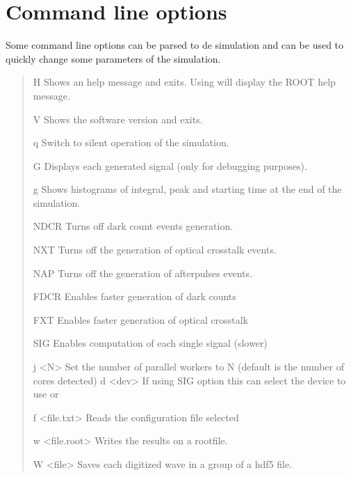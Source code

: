 \documentclass[letterpaper,10pt,english]{sphinxmanual}
\begin{document}
\section{Command line options}
\label{\detokenize{setup:command-line-options}}\label{\detokenize{setup:clineopts}}
Some command line options can be parsed to de simulation and can be used to quickly change some parameters of the simulation.
\begin{quote}
\begin{optionlist}{3cm}
\item [\sphinxhyphen{}H]  
Shows an help message and exits. Using  will display the ROOT help message.
\item [\sphinxhyphen{}V]  
Shows the software version and exits.
\item [\sphinxhyphen{}q]  
Switch to silent operation of the simulation.
\item [\sphinxhyphen{}G]  
Displays each generated signal (only for debugging purposes).
\item [\sphinxhyphen{}g]  
Shows histograms of integral, peak and starting time at the end of the simulation.
\item [\sphinxhyphen{}NDCR]  
Turns off dark count events generation.
\item [\sphinxhyphen{}NXT]  
Turns off the generation of optical crosstalk events.
\item [\sphinxhyphen{}NAP]  
Turns off the generation of afterpulses events.
\item [\sphinxhyphen{}FDCR]  
Enables faster generation of dark counts {\hyperref[\detokenize{theory:dcrtheory}]{}}
\item [\sphinxhyphen{}FXT]  
Enables faster generation of optical crosstalk {\hyperref[\detokenize{theory:xttheory}]{}}
\item [\sphinxhyphen{}SIG]  
Enables computation of each single signal (slower)
\item [\sphinxhyphen{}j \textless{}N\textgreater{}]  
Set the number of parallel workers to N (default is the number of cores detected)
\sphinxhyphen{}d \textless{}dev\textgreater{} If using \sphinxhyphen{}SIG option this can select the device to use  or 
\item [\sphinxhyphen{}f \textless{}file.txt\textgreater{}]  
Reads the configuration file selected
\item [\sphinxhyphen{}w \textless{}file.root\textgreater{}]  
Writes the results on a rootfile.
\item [\sphinxhyphen{}W \textless{}file\textgreater{}]  
Saves each digitized wave in a group of a hdf5 file.
\end{optionlist}
\end{quote}
\end{document}
